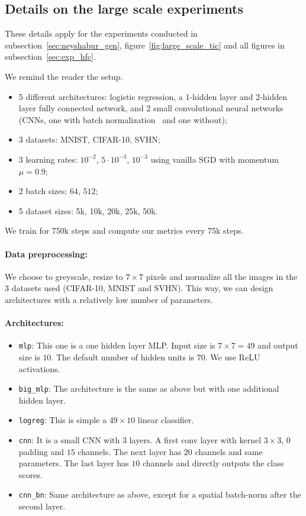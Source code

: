 

\subsection{Details on the large scale experiments}
\label{app:exp_details}
These details apply for the experiments conducted in subsection~\ref{sec:neyshabur_gen}, figure~\ref{fig:large_scale_tic} and all figures in subsection~\ref{sec:exp_hfc}.

We remind the reader the setup.
\begin{itemize}
    \item 5 different architectures: logistic regression, a 1-hidden layer and 2-hidden layer fully connected network, and 2 small convolutional neural networks (CNNs, one with batch normalization~\citep{ioffe2015batch} and one without);
    \item 3 datasets: MNIST, CIFAR-10, SVHN;
    \item 3 learning rates: $10^{-2}$, $5\cdot 10^{-3}$, $10^{-3}$ using vanilla SGD with momentum $\mu = 0.9$;
    \item 2 batch sizes: $64$, $512$;
    \item 5 dataset sizes: 5k, 10k, 20k, 25k, 50k.
\end{itemize}
We train for 750k steps and compute our metrics every 75k steps.

\paragraph{Data preprocessing:} We choose to greyscale, resize to $7 \times 7$ pixels and normalize all the images in the 3 datasets used (CIFAR-10, MNIST and SVHN). This way, we can design architectures with a relatively low number of parameters.


\paragraph{Architectures:}

\begin{itemize}
    \item \texttt{mlp}: This one is a one hidden layer MLP. Input size is $7 \times 7 = 49$ and output size is $10$. The default number of hidden units is $70$. We use ReLU activations.
    \item \texttt{big\_mlp}: The architecture is the same as above but with one additional hidden layer.
    \item \texttt{logreg}: This is simple a $49 \times 10$ linear classifier.
    \item \texttt{cnn}: It is a small CNN with 3 layers. A first conv layer with kernel $3 \times 3$, $0$ padding and $15$ channels. The next layer has $20$ channels and same parameters. The last layer has $10$ channels and directly outputs the class scores.
    \item \texttt{cnn\_bn}: Same architecture as above, except for a spatial batch-norm after the second layer.
\end{itemize}

